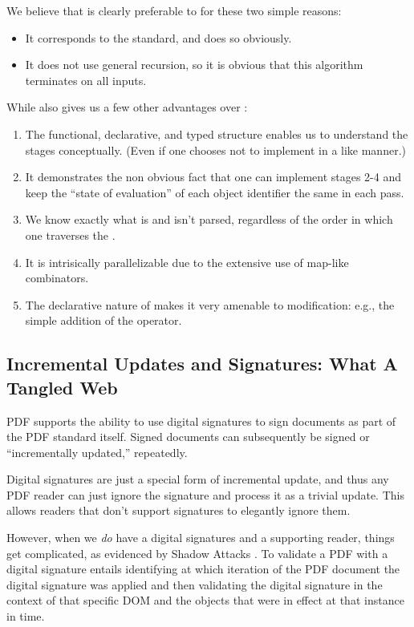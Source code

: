 We believe that \ssp{} is clearly preferable to \dsp{} for these two
simple reasons:
\begin{itemize}
\item It corresponds to the standard, and does so obviously.
\item It does not use general recursion, so it is obvious that this
  algorithm terminates on all inputs.
\end{itemize}
While \ssp{} also gives us a few other advantages over \dsp{}:
\begin{enumerate}
\item The functional, declarative, and typed structure enables
  us to understand the stages conceptually.  (Even if one chooses
  not to implement in a like manner.)
\item It demonstrates the non obvious fact that one can
  implement stages 2-4 and keep the ``state of evaluation'' of each
  object identifier the same in each pass.
\item We know exactly what is and isn't parsed, regardless of the
  order in which one traverses the .
\item It is intrisically parallelizable due to the extensive use of
  map-like combinators.
\item The declarative nature of \ssp{} makes it very amenable to
  modification: e.g., the simple addition of the 
  operator.
\end{enumerate}

\subsection{Incremental Updates and Signatures: What A Tangled Web}
\label{sec:updates-and-signatures}

PDF supports the ability to use digital signatures to sign documents
as part of the PDF standard itself.  Signed documents can
subsequently be signed or ``incrementally updated,'' repeatedly.

Digital signatures are just a special form of incremental update, and
thus any PDF reader can just ignore the signature and process it as a
trivial update.  This allows readers that don't support signatures to
elegantly ignore them.

However, when we \emph{do} have a digital signatures and a supporting
reader, things get complicated, as evidenced by Shadow Attacks
\cite{mladenovTrillionDollarRefund2019,ndsssymposiumNDSS2021Shadow2021}.
%
To validate a PDF with a digital signature entails identifying at
which iteration of the PDF document the digital signature was applied
and then validating the digital signature in the context of that
specific DOM and the objects that were in effect at that instance in
time.

